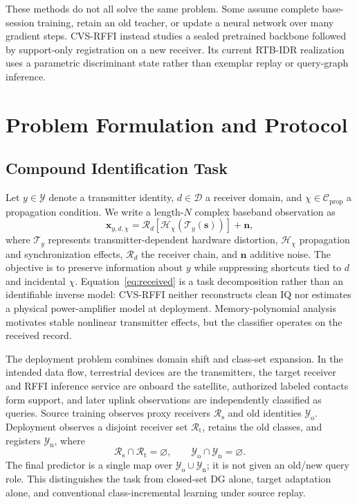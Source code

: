 \documentclass[journal]{IEEEtran}
\newcommand{\method}{CVS-RFFI}
\newcommand{\stagehead}{RTB-IDR}
\newcommand{\Rsource}{\mathcal{R}_{\mathrm{s}}}
\newcommand{\Rtarget}{\mathcal{R}_{\mathrm{t}}}
\newcommand{\Yold}{\mathcal{Y}_{\mathrm{o}}}
\newcommand{\Ynew}{\mathcal{Y}_{\mathrm{n}}}
\begin{document}
These methods do not all solve the same problem. Some assume complete base-session training, retain an old teacher, or update a neural network over many gradient steps. \method{} instead studies a sealed pretrained backbone followed by support-only registration on a new receiver. Its current \stagehead{} realization uses a parametric discriminant state rather than exemplar replay or query-graph inference.

\section{Problem Formulation and Protocol}

\subsection{Compound Identification Task}

Let \(y\in\mathcal{Y}\) denote a transmitter identity, \(d\in\mathcal{D}\) a receiver domain, and \(\chi\in\mathcal{C}_{\mathrm{prop}}\) a propagation condition. We write a length-\(N\) complex baseband observation as
\begin{equation}
\mathbf{x}_{y,d,\chi} =
\mathcal{R}_{d}\!\left[
\mathcal{H}_{\chi}\!\left(
\mathcal{T}_{y}(\mathbf{s})
\right)
\right]+\mathbf{n},
\label{eq:received}
\end{equation}
where \(\mathcal{T}_{y}\) represents transmitter-dependent hardware distortion, \(\mathcal{H}_{\chi}\) propagation and synchronization effects, \(\mathcal{R}_{d}\) the receiver chain, and \(\mathbf{n}\) additive noise. The objective is to preserve information about \(y\) while suppressing shortcuts tied to \(d\) and incidental \(\chi\). Equation~\eqref{eq:received} is a task decomposition rather than an identifiable inverse model: \method{} neither reconstructs clean IQ nor estimates a physical power-amplifier model at deployment. Memory-polynomial analysis \cite{ding2004memory} motivates stable nonlinear transmitter effects, but the classifier operates on the received record.

The deployment problem combines domain shift and class-set expansion. In the intended data flow, terrestrial devices are the transmitters, the target receiver and RFFI inference service are onboard the satellite, authorized labeled contacts form support, and later uplink observations are independently classified as queries. Source training observes proxy receivers \(\Rsource\) and old identities \(\Yold\). Deployment observes a disjoint receiver set \(\Rtarget\), retains the old classes, and registers \(\Ynew\), where
\begin{equation}
\Rsource\cap\Rtarget=\varnothing,\qquad
\Yold\cap\Ynew=\varnothing.
\end{equation}
The final predictor is a single map over \(\Yold\cup\Ynew\); it is not given an old/new query role. This distinguishes the task from closed-set DG alone, target adaptation alone, and conventional class-incremental learning under source replay.
\end{document}

